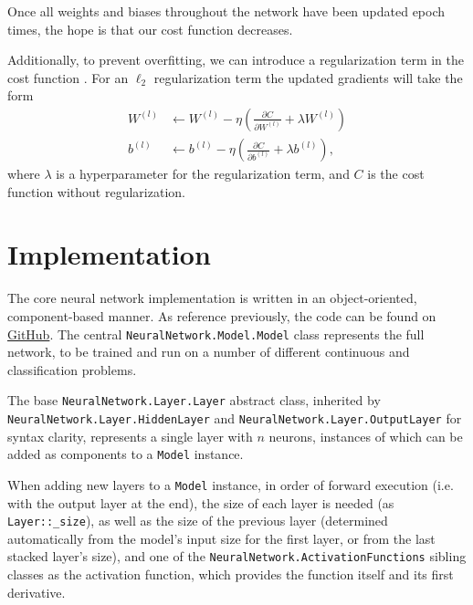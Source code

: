 \documentclass[aps,reprint,superscriptaddress,nofootinbib]{revtex4-2}
\begin{document}
Once all weights and biases throughout the network have been updated epoch times, the hope is that our cost function decreases.

Additionally, to prevent overfitting, we can introduce a regularization term in the cost function \cite{hastie}. For an \(\ell_2\) regularization term the updated gradients will take the form
\begin{align*}
    W^{(l)} &\xleftarrow{} W^{(l)} - \eta \left( \frac{\partial C}{\partial W^{(l)}} + \lambda W^{(l)} \right)
    \\
    b^{(l)} &\xleftarrow{} b^{(l)} - \eta \left( \frac{\partial C}{\partial b^{(l)}} + \lambda b^{(l)} \right),
\end{align*}
where \(\lambda\) is a hyperparameter for the regularization term, and \(C\) is the cost function without regularization.

\section*{Implementation}

The core neural network implementation is written in an object-oriented, component-based manner. As reference previously, the code can be found on \href{https://github.com/jgci2000/FYS-STK4155-projects/tree/master/}{GitHub}. The central \texttt{Neural\-Network.\linebreak[0]Model.\linebreak[0]Model} class represents the full network, to be trained and run on a number of different continuous and classification problems.

The base \texttt{Neural\-Network.\linebreak[0]Layer.\linebreak[0]Layer} abstract class, inherited by \texttt{Neural\-Network.\linebreak[0]Layer.\linebreak[0]Hidden\-Layer} and \texttt{Neural\-Network.\linebreak[0]Layer.\linebreak[0]Output\-Layer} for syntax clarity, represents a single layer with \(n\) neurons, instances of which can be added as components to a \texttt{Model} instance.

When adding new layers to a \texttt{Model} instance, in order of forward execution (i.e. with the output layer at the end), the size of each layer is needed (as \texttt{Layer::\linebreak[0]\_size}), as well as the size of the previous layer (determined automatically from the model's input size for the first layer, or from the last stacked layer's size), and one of the \texttt{Neural\-Network.\linebreak[0]Activation\-Functions} sibling classes as the activation function, which provides the function itself and its first derivative.
\end{document}
